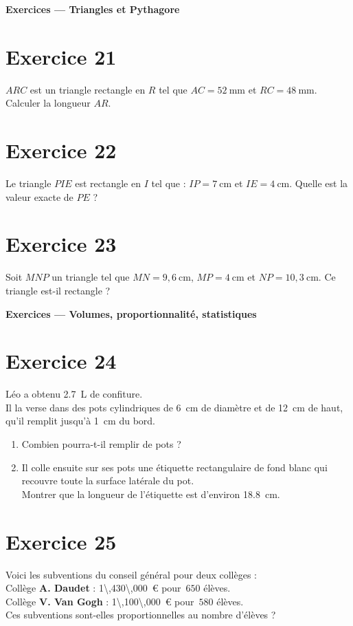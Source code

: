 \documentclass[a4paper,11pt]{article}
\begin{document}
\bigskip
{\Large \textbf{Exercices — Triangles et Pythagore}}\par\medskip

\section*{Exercice 21}
\(ARC\) est un triangle rectangle en \(R\) tel que \(AC=52\ \text{mm}\) et \(RC=48\ \text{mm}\).  
Calculer la longueur \(AR\).

\section*{Exercice 22}
Le triangle \(PIE\) est rectangle en \(I\) tel que : \(IP=7\ \text{cm}\) et \(IE=4\ \text{cm}\).  
Quelle est la valeur exacte de \(PE\) ?

\section*{Exercice 23}
Soit \(MNP\) un triangle tel que \(MN=9{,}6\ \text{cm}\), \(MP=4\ \text{cm}\) et \(NP=10{,}3\ \text{cm}\).  
Ce triangle est-il rectangle ?

{\Large \textbf{Exercices — Volumes, proportionnalité, statistiques}}\par\medskip

\section*{Exercice 24}
Léo a obtenu \SI{2,7}{\liter} de confiture.\\
Il la verse dans des pots cylindriques de \SI{6}{\centi\meter} de diamètre et de \SI{12}{\centi\meter} de haut, qu’il remplit jusqu’à \SI{1}{\centi\meter} du bord.
\begin{enumerate}
  \item Combien pourra-t-il remplir de pots ?
  \item Il colle ensuite sur ses pots une étiquette rectangulaire de fond blanc qui recouvre toute la surface latérale du pot.\\
  Montrer que la longueur de l’étiquette est d’environ \SI{18,8}{\centi\meter}.
\end{enumerate}

\bigskip
\section*{Exercice 25}
Voici les subventions du conseil général pour deux collèges :\\[2pt]
\quad Collège \textbf{A. Daudet} : \SI{1\,430\,000}{\euro} pour \(\,650\) élèves.\\
\quad Collège \textbf{V. Van Gogh} : \SI{1\,100\,000}{\euro} pour \(\,580\) élèves.\\[2pt]
Ces subventions sont-elles proportionnelles au nombre d’élèves ?
\end{document}

